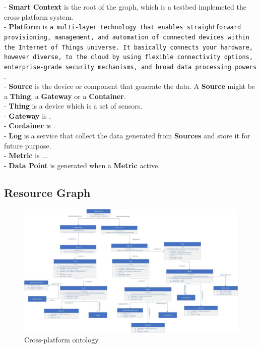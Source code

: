 \documentclass[runningheads,a4paper]{llncs}
\begin{document}
- \textbf{Smart Context} is the root of the graph, which is a testbed implemeted the cross-platform system. \\
- \textbf{Platform} is \texttt{a multi-layer technology that enables straightforward provisioning, management, and automation of connected devices within the Internet of Things universe. It basically connects your hardware, however diverse, to the cloud by using flexible connectivity options, enterprise-grade security mechanisms, and broad data processing powers} \cite{platform}. \\
- \textbf{Source} is the device or component that generate the data. A \textbf{Source} might be a \textbf{Thing}, a \textbf{Gateway} or a \textbf{Container}. \\
- \textbf{Thing} is a device which is a set of sensors. \\
- \textbf{Gateway} is   .\\
- \textbf{Container} is   . \\
- \textbf{Log} is a service that collect the data generated from \textbf{Sources} and store it for future purpose. \\
- \textbf{Metric} is ... \\
- \textbf{Data Point} is generated when a \textbf{Metric} active. \\

\subsection{Resource Graph}

\begin{figure}[h]
\centering
\includegraphics[scale=0.2]{resource_graph} 
\caption{Cross-platform ontology.}
\end{figure} 
\end{document}
